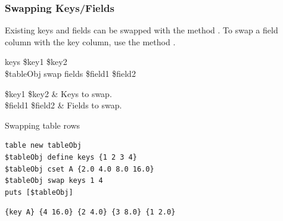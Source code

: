 \subsubsection{Swapping Keys/Fields}
Existing keys and fields can be swapped with the method .
To swap a field column with the key column, use the method .

\begin{syntax}
 keys \$key1 \$key2 \\
\$tableObj swap fields \$field1 \$field2
\end{syntax}
\begin{args}
\$key1 \$key2 & Keys to swap. \\
\$field1 \$field2 & Fields to swap.
\end{args}

\begin{example}{Swapping table rows}
\begin{lstlisting}
table new tableObj
$tableObj define keys {1 2 3 4}
$tableObj cset A {2.0 4.0 8.0 16.0}
$tableObj swap keys 1 4
puts [$tableObj]
\end{lstlisting}
\tcblower
\begin{lstlisting}
{key A} {4 16.0} {2 4.0} {3 8.0} {1 2.0}
\end{lstlisting}
\end{example}

\clearpage



